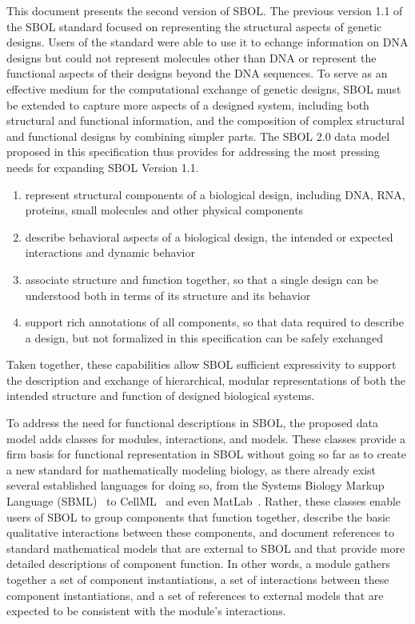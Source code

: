 This document presents the second version of SBOL.
The previous version 1.1 of the SBOL standard focused on representing the structural aspects of genetic designs. 
Users of the standard were able to use it to echange information on DNA designs but could not represent molecules other than DNA or represent the functional aspects of their designs beyond the DNA sequences. 
To serve as an effective medium for the computational exchange of genetic designs, SBOL must be extended to capture more aspects of a designed system, including both structural and functional information, and the composition of complex structural and functional designs by combining simpler parts. The SBOL 2.0 data model proposed in this specification thus provides for addressing the most pressing needs for expanding SBOL Version 1.1. 

\begin{enumerate}

\item represent structural components of a biological design, including DNA, RNA, proteins, small molecules and other physical components

\item describe behavioral aspects of a biological design, the intended or expected interactions and dynamic behavior

\item associate structure and function together, so that a single design can be understood both in terms of its structure and its behavior

\item support rich annotations of all components, so that data required to describe a design, but not formalized in this specification can be safely exchanged

\end{enumerate}

Taken together, these capabilities allow SBOL sufficient expressivity to support the description and exchange of hierarchical, modular representations of both the intended structure and function of designed biological systems.

To address the need for functional descriptions in SBOL, the proposed data model adds classes for modules, interactions, and models. These classes provide a firm basis for functional representation in SBOL without going so far as to create a new standard for mathematically modeling biology, as there already exist several established languages for doing so, from the Systems Biology Markup Language (SBML)~\cite{SBML} to CellML~\cite{CellML} and even MatLab~\cite{matlab}. Rather, these classes enable users of SBOL to group components that function together, describe the basic qualitative interactions between these components, and document references to standard mathematical models that are external to SBOL and that provide more detailed descriptions of component function. In other words, a module gathers together a set of component instantiations, a set of interactions between these component instantiations, and a set of references to external models that are expected to be consistent with the module's interactions.

